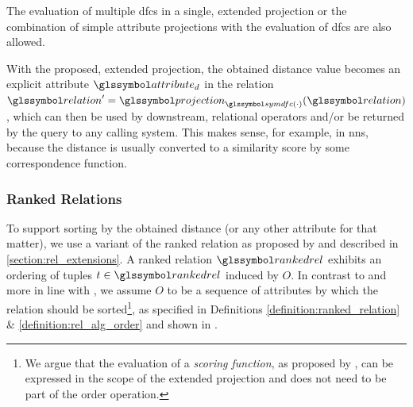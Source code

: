 The evaluation of multiple \acrshort{dfc}s in a single, extended projection or the combination of simple attribute projections with the evaluation of \acrshort{dfc}s are also allowed.

With the proposed, extended projection, the obtained distance value becomes an explicit attribute $\attribute_d$ in the relation $ \relation^{\prime} = \projection_{\symdfc(\cdot)}(\relation)$, which can then be used by downstream, relational operators and/or be returned by the query to any calling system. This makes sense, for example, in \acrshort{nns}, because the distance is usually converted to a similarity score by some correspondence function.

\subsubsection{Ranked Relations}

To support sorting by the obtained distance (or any other attribute for that matter), we use a variant of the ranked relation as proposed by \cite{Chengkai:2005RankSQL} and described in \cref{section:rel_extensions}. A ranked relation $\rankedrel$ exhibits an ordering of tuples $t \in \rankedrel$ induced by $O$. In contrast to \cite{Chengkai:2005RankSQL} and more in line with \cite{Garcia:2009Database}, we assume $O$ to be a sequence of attributes by which the relation should be sorted\footnote{We argue that the evaluation of a \emph{scoring function}, as proposed by \cite{Chengkai:2005RankSQL}, can be expressed in the scope of the extended projection and does not need to be part of the order operation.}, as specified in Definitions \ref{definition:ranked_relation} \& \ref{definition:rel_alg_order} and shown in  .

